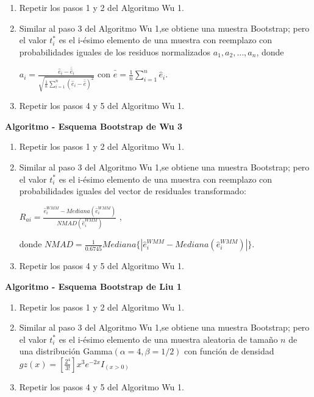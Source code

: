 \begin{enumerate}
	\item Repetir los pasos 1 y 2 del Algoritmo Wu 1.
	
	\item  Similar al paso 3 del Algoritmo Wu 1,se obtiene una muestra Bootstrap;
	pero el valor $t^{*}_{i}$ es el i-ésimo elemento de una muestra con reemplazo con probabilidades iguales de los residuos normalizados $a_{1},a_{2}, \dots,a_{n}$, donde
	
	\begin{center}
		$a_{i} = \frac{\hat{e}_{i}-\bar{\hat{ e}}_{i}}{ \sqrt{ \frac{1}{n} \sum_{i=1}^{n} (\hat{e}_{i}-\bar{\hat{e}})^{2} } }$ con $ \bar{\hat{e}}= \frac{1}{n} \sum_{i=1}^{n} \hat{e}_{i} $.
	\end{center}
	
	\item Repetir los pasos 4 y 5 del Algoritmo Wu 1.
\end{enumerate}



\textbf{Algoritmo - Esquema Bootstrap de Wu 3}

\begin{enumerate}
	\item Repetir los pasos 1 y 2 del Algoritmo Wu 1.
	
	\item  Similar al paso 3 del Algoritmo Wu 1,se obtiene una muestra Bootstrap;
	pero el valor $t^{*}_{i}$ es el i-ésimo elemento de una muestra con reemplazo con probabilidades iguales del vector de residuales transformado:
	
	\begin{center}
		$R_{ai} = \frac{\hat{e}^{WMM}_{i} - Mediana(\hat{e}^{WMM}_{i})}{ NMAD(\hat{e}^{WMM}_{i})  }$ ,
	\end{center}
	donde $NMAD = \frac{1}{0.6745} Mediana\{ | \hat{e}^{WMM}_{i} - Mediana(\hat{e}^{WMM}_{i}) | \}$.
	
	\item Repetir los pasos 4 y 5 del Algoritmo Wu 1.
\end{enumerate}


\textbf{Algoritmo - Esquema Bootstrap de Liu 1}

\begin{enumerate}
	\item Repetir los pasos 1 y 2 del Algoritmo Wu 1.
	
	\item  Similar al paso 3 del Algoritmo Wu 1,se obtiene una muestra Bootstrap;
	pero el valor $t^{*}_{i}$ es el i-ésimo elemento de una muestra aleatoria de tamaño $n$ de una distribución Gamma$(\alpha = 4,\beta = 1/2)$ con función de densidad $ gz(x) = [\frac{2^{4}}{3!}]x^{3}e^{-2x}I_{(x>0)}$ 

	
	\item Repetir los pasos 4 y 5 del Algoritmo Wu 1.
\end{enumerate}




